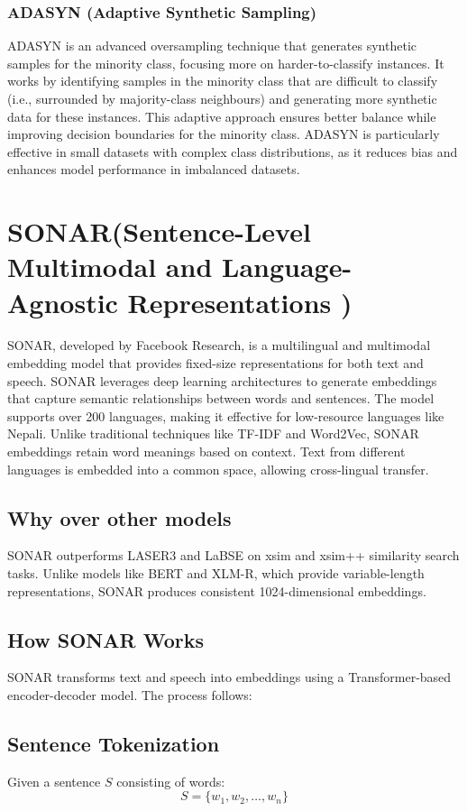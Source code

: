 \subsubsection{ADASYN (Adaptive Synthetic Sampling)}
ADASYN is an advanced oversampling technique that generates synthetic samples for the minority class, focusing more on harder-to-classify instances. It works by identifying samples in the minority class that are difficult to classify (i.e., surrounded by majority-class neighbours) and generating more synthetic data for these instances. This adaptive approach ensures better balance while improving decision boundaries for the minority class. ADASYN is particularly effective in small datasets with complex class distributions, as it reduces bias and enhances model performance in imbalanced datasets.

\section{SONAR(Sentence-Level Multimodal and Language-Agnostic Representations )}
SONAR, developed by Facebook Research, is a multilingual and multimodal embedding model that provides fixed-size representations for both text and speech.
SONAR leverages deep learning architectures to generate embeddings that capture semantic relationships between words and sentences. The model supports over 200 languages, making it effective for low-resource languages like Nepali.
Unlike traditional techniques like TF-IDF and Word2Vec, SONAR embeddings retain word meanings based on context.
Text from different languages is embedded into a common space, allowing cross-lingual transfer.
\subsection{Why over other models }
SONAR outperforms LASER3 and LaBSE on xsim and xsim++ similarity search tasks.
 Unlike models like BERT and XLM-R, which provide variable-length representations, SONAR produces consistent 1024-dimensional embeddings.
\subsection{How SONAR Works}
SONAR transforms text and speech into embeddings using a Transformer-based encoder-decoder model. The process follows:
\subsection{Sentence Tokenization}
Given a sentence $S$ consisting of words:
\begin{equation}
    S = \{w_1, w_2, \dots, w_n\}
\end{equation}

